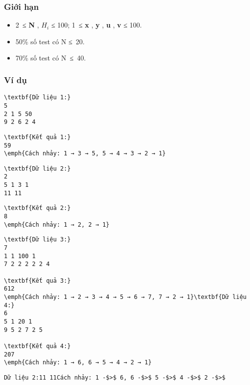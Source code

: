\subsubsection{   Giới hạn  }
\begin{itemize}
	\item     2 ≤    \textbf{     N    }    ,    \textbf{     $H_{i}$}    ≤ 100; 1 ≤    \textbf{     x    }    ,    \textbf{     y    }    ,    \textbf{     u    }    ,    \textbf{     v    }    ≤ 100.   
	\item     50\% số test có N ≤ 20.   
	\item     70\% số test có N ≤ 40.   
\end{itemize}

\subsubsection{   Ví dụ  }
\begin{verbatim}
\textbf{Dữ liệu 1:}
5
2 1 5 50
9 2 6 2 4\end{verbatim}
\begin{verbatim}
\textbf{Kết quả 1:}
59
\emph{Cách nhảy: 1 → 3 → 5, 5 → 4 → 3 → 2 → 1}\end{verbatim}
\begin{verbatim}
\textbf{Dữ liệu 2:}
2
5 1 3 1
11 11\end{verbatim}
\begin{verbatim}
\textbf{Kết quả 2:}
8
\emph{Cách nhảy: 1 → 2, 2 → 1}\end{verbatim}
\begin{verbatim}
\textbf{Dữ liệu 3:}
7
1 1 100 1
7 2 2 2 2 2 4

\textbf{Kết quả 3:}
612
\emph{Cách nhảy: 1 → 2 → 3 → 4 → 5 → 6 → 7, 7 → 2 → 1}\textbf{Dữ liệu 4:}
6
5 1 20 1
9 5 2 7 2 5

\textbf{Kết quả 4:}
207
\emph{Cách nhảy: 1 → 6, 6 → 5 → 4 → 2 → 1}\end{verbatim}
\begin{verbatim}
Dữ liệu 2:11 11Cách nhảy: 1 -$>$ 6, 6 -$>$ 5 -$>$ 4 -$>$ 2 -$>$ \end{verbatim}
